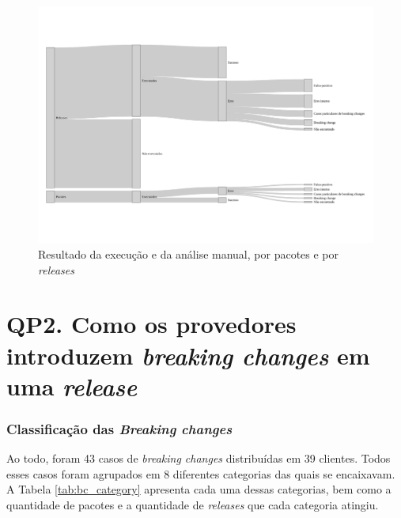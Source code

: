 \begin{figure}
    \centering
    \includegraphics[scale=0.5]{figuras/general_results.pdf}
    \caption{Resultado da execução e da análise manual, por pacotes e por \textit{releases}}
    \label{fig:res_rq1_g}
\end{figure}{}

\section{QP2. Como os provedores introduzem \textit{breaking changes} em uma \textit{release}}
\label{res:qp2}

\subsubsection{\textbf{Classificação das \textit{Breaking changes}}}

Ao todo, foram 43 casos de \textit{breaking changes} distribuídas em 39 clientes. Todos esses casos foram agrupados em 8 diferentes categorias das quais se encaixavam. A Tabela \ref{tab:bc_category} apresenta cada uma dessas categorias, bem como a quantidade de pacotes e a quantidade de \textit{releases} que cada categoria atingiu.

